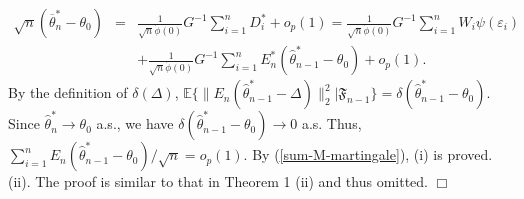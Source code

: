 \documentclass[12pt]{article}
\def\wh{\widehat}
\def\ol{\overline}
\begin{document}
\begin{eqnarray}\label{sum-M-martingale}
\sqrt{n}(\ol{\theta}_n^*-\theta_0)&=&\frac{1}{\sqrt{n}\dot{\phi}(0)}G^{-1}\sum_{i=1}^n D_i^*+ o_p(1)=\frac{1}{\sqrt{n}\dot{\phi}(0)}G^{-1}\sum_{i=1}^n W_i \psi(\varepsilon_i)\nonumber\\
&& +\frac{1}{\sqrt{n}\dot{\phi}(0)}G^{-1}\sum_{i=1}^n E^*_n(\wh{\theta}^*_{n-1}-\theta_0)+o_p(1).
\end{eqnarray}
 By the definition of $\delta(\Delta)$,  $\mathbb{E}\{\|E_n(\wh{\theta}^*_{n-1}-\Delta)\|_2^2|\mathfrak{F}_{n-1}\}=\delta(\wh{\theta}^*_{n-1}-\theta_0)$.
Since $\wh{\theta}^*_n\rightarrow\theta_0$ a.s., we have $\delta(\wh{\theta}^*_{n-1}-\theta_0)\rightarrow 0$ a.s. Thus, $\sum_{i=1}^n E_n(\wh{\theta}^*_{n-1}-\theta_0)/\sqrt{n}=o_p(1)$. By (\ref{sum-M-martingale}), (i) is proved.\\
(ii). The proof is similar to that in Theorem 1 (ii) and thus omitted. $\Box$

\newpage


\end{document}
